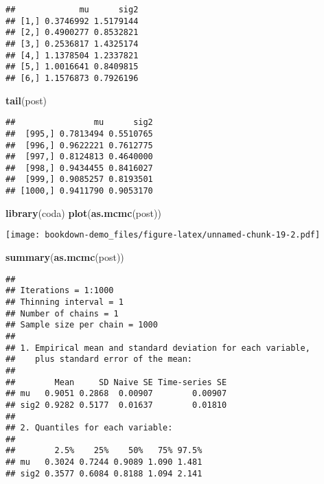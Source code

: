 \documentclass[
]{book}
\newenvironment{Shaded}{\begin{snugshade}}{\end{snugshade}}
\newcommand{\DataTypeTok}[1]{\textcolor[rgb]{0.13,0.29,0.53}{#1}}
\newcommand{\DecValTok}[1]{\textcolor[rgb]{0.00,0.00,0.81}{#1}}
\newcommand{\FloatTok}[1]{\textcolor[rgb]{0.00,0.00,0.81}{#1}}
\newcommand{\KeywordTok}[1]{\textcolor[rgb]{0.13,0.29,0.53}{\textbf{#1}}}
\newcommand{\NormalTok}[1]{#1}
\newcommand{\OperatorTok}[1]{\textcolor[rgb]{0.81,0.36,0.00}{\textbf{#1}}}
\begin{document}
\begin{Shaded}
\end{Shaded}

\begin{verbatim}
##             mu      sig2
## [1,] 0.3746992 1.5179144
## [2,] 0.4900277 0.8532821
## [3,] 0.2536817 1.4325174
## [4,] 1.1378504 1.2337821
## [5,] 1.0016641 0.8409815
## [6,] 1.1576873 0.7926196
\end{verbatim}

\begin{Shaded}
\begin{Highlighting}[]
\KeywordTok{tail}\NormalTok{(post)}
\end{Highlighting}
\end{Shaded}

\begin{verbatim}
##                mu      sig2
##  [995,] 0.7813494 0.5510765
##  [996,] 0.9622221 0.7612775
##  [997,] 0.8124813 0.4640000
##  [998,] 0.9434455 0.8416027
##  [999,] 0.9085257 0.8193501
## [1000,] 0.9411790 0.9053170
\end{verbatim}

\begin{Shaded}
\begin{Highlighting}[]
\KeywordTok{library}\NormalTok{(coda)}
\KeywordTok{plot}\NormalTok{(}\KeywordTok{as.mcmc}\NormalTok{(post))}
\end{Highlighting}
\end{Shaded}

\texttt{[image: bookdown-demo\_files/figure-latex/unnamed-chunk-19-2.pdf]}

\begin{Shaded}
\begin{Highlighting}[]
\KeywordTok{summary}\NormalTok{(}\KeywordTok{as.mcmc}\NormalTok{(post))}
\end{Highlighting}
\end{Shaded}

\begin{verbatim}
## 
## Iterations = 1:1000
## Thinning interval = 1 
## Number of chains = 1 
## Sample size per chain = 1000 
## 
## 1. Empirical mean and standard deviation for each variable,
##    plus standard error of the mean:
## 
##        Mean     SD Naive SE Time-series SE
## mu   0.9051 0.2868  0.00907        0.00907
## sig2 0.9282 0.5177  0.01637        0.01810
## 
## 2. Quantiles for each variable:
## 
##        2.5%    25%    50%   75% 97.5%
## mu   0.3024 0.7244 0.9089 1.090 1.481
## sig2 0.3577 0.6084 0.8188 1.094 2.141
\end{verbatim}
\end{document}
